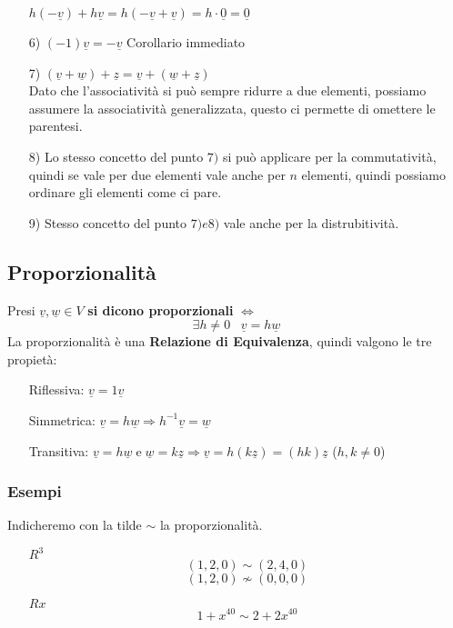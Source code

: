 \begin{itemize}
$ h(-\underline{v}) + h\underline{v} = h(-\underline{v} + \underline{v}) = h \cdot \underline{0} = \underline{0} $
\item[6)] $ (-1)\underline{v} = - \underline{v}$ Corollario immediato
\item[7)] $ (\underline{v} + \underline{w}) + \underline{z} = \underline{v} + (\underline{w} + \underline{z})$ \\
Dato che l'associatività si può sempre ridurre a due elementi, possiamo assumere la associatività generalizzata, questo ci permette di omettere le parentesi.
\item[8)] Lo stesso concetto del punto $7)$ si può applicare per la commutatività, quindi se vale per due elementi vale anche per $n$ elementi, quindi possiamo ordinare gli elementi come ci pare.
\item[9)] Stesso concetto del punto $7) e 8)$ vale anche per la distrubitività.
\end{itemize}

\subsection{Proporzionalità}
Presi $\underline{v}, \underline{w} \in V$ \textbf{si dicono proporzionali} $\Leftrightarrow$
$$ \exists h \neq 0 \;\;\; \underline{v} = h \underline{w}$$
La proporzionalità è una \textbf{Relazione di Equivalenza}, quindi valgono le tre propietà:
\begin{itemize}
\item[]Riflessiva: $\underline{v} = 1 \underline{v}$
\item[]Simmetrica: $\underline{v} = h \underline{w} \Rightarrow h^{-1}\underline{v} = \underline{w}$
\item[]Transitiva: $ \underline{v} = h \underline{w} \; \text{e} \; \underline{w} = k \underline{z} \Rightarrow \underline{v} = h(k\underline{z}) = (hk)\underline{z} $ ($h,k \neq 0$)
\end{itemize}

\subsubsection{Esempi}
Indicheremo con la tilde $\sim$ la proporzionalità.
\begin{itemize}
\item[$R^3$] $$ (1,2,0) \sim (2,4,0) $$ $$ (1,2,0) \not \sim (0,0,0) $$
\item[$Rx$] $$ 1+x^{40} \sim 2+2x^{40} $$
\end{itemize}

